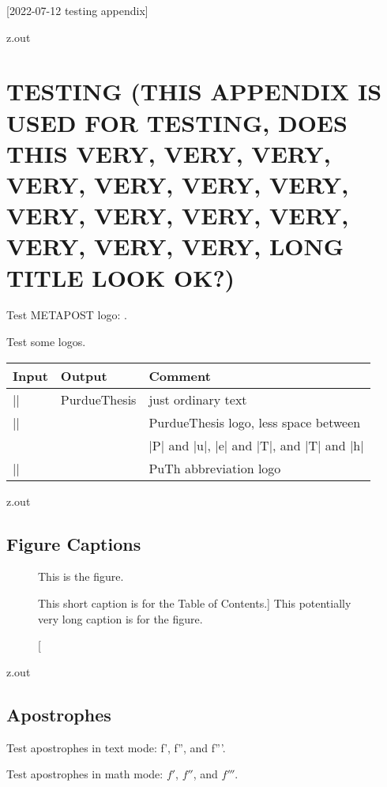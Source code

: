[2022-07-12 testing appendix]

\begin{VerbatimOut}{z.out}
\chapter{TESTING (THIS APPENDIX IS USED FOR TESTING, DOES THIS
  VERY, VERY, VERY, VERY, VERY, VERY, VERY,
  VERY, VERY, VERY, VERY, VERY, VERY, VERY,
  LONG TITLE LOOK OK?)}

Test METAPOST logo: \METAPOSTLogo.

Test some logos.
\begin{inlinetable}
  \begin{tabular}{@{}lll@{}}
    \toprule
    \textbf{Input}&       \textbf{Output}&  \textbf{Comment}\\
    \midrule
    |\PurdueThesis|&      PurdueThesis&     just ordinary text\\
    |\PurdueThesisLogo|& \PurdueThesisLogo& PurdueThesis logo, less space between\\
    &                     &                 |P| and |u|, |e| and |T|, and |T| and |h|\\
    |\PuThLogo|&          \PuThLogo&        PuTh abbreviation logo\\
    \bottomrule
  \end{tabular}
\end{inlinetable}
\end{VerbatimOut}

\MyIO


\begin{VerbatimOut}{z.out}


\section{Figure Captions}

\begin{figure}[h]
  This is the figure.
  \caption
  [This short caption is for the Table of Contents.]%
  {This potentially very long caption is for the figure.}
\end{figure}
\end{VerbatimOut}

\MyIO
  

\begin{VerbatimOut}{z.out}


\section{Apostrophes}

Test apostrophes in text mode: f', f'', and f'''.

Test apostrophes in math mode: \(f'\), \(f''\), and \(f'''\).
\end{VerbatimOut}

